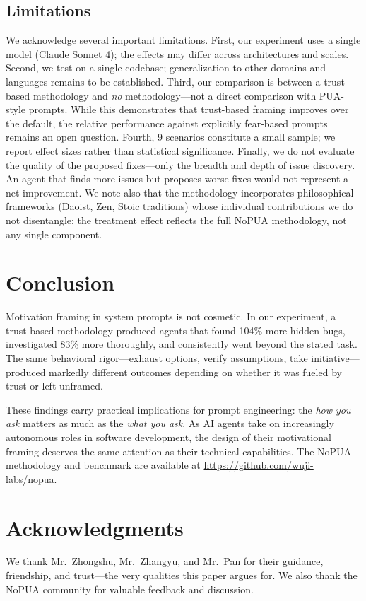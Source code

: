 \documentclass[11pt]{article}
\begin{document}
\subsection{Limitations}

We acknowledge several important limitations. First, our experiment uses a single model (Claude Sonnet 4); the effects may differ across architectures and scales. Second, we test on a single codebase; generalization to other domains and languages remains to be established. Third, our comparison is between a trust-based methodology and \textit{no} methodology---not a direct comparison with PUA-style prompts. While this demonstrates that trust-based framing improves over the default, the relative performance against explicitly fear-based prompts remains an open question. Fourth, 9 scenarios constitute a small sample; we report effect sizes rather than statistical significance. Finally, we do not evaluate the quality of the proposed fixes---only the breadth and depth of issue discovery. An agent that finds more issues but proposes worse fixes would not represent a net improvement. We note also that the methodology incorporates philosophical frameworks (Daoist, Zen, Stoic traditions) whose individual contributions we do not disentangle; the treatment effect reflects the full NoPUA methodology, not any single component.

\section{Conclusion}

Motivation framing in system prompts is not cosmetic. In our experiment, a trust-based methodology produced agents that found 104\% more hidden bugs, investigated 83\% more thoroughly, and consistently went beyond the stated task. The same behavioral rigor---exhaust options, verify assumptions, take initiative---produced markedly different outcomes depending on whether it was fueled by trust or left unframed.

These findings carry practical implications for prompt engineering: the \textit{how you ask} matters as much as the \textit{what you ask}. As AI agents take on increasingly autonomous roles in software development, the design of their motivational framing deserves the same attention as their technical capabilities. The NoPUA methodology and benchmark are available at \url{https://github.com/wuji-labs/nopua}.

\section*{Acknowledgments}

We thank Mr.\ Zhongshu, Mr.\ Zhangyu, and Mr.\ Pan for their guidance, friendship, and trust---the very qualities this paper argues for. We also thank the NoPUA community for valuable feedback and discussion.



\end{document}
